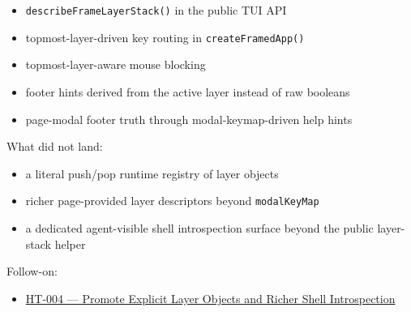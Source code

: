 \begin{itemize}
\tightlist
\item
  \texttt{d\allowbreak{}e\allowbreak{}s\allowbreak{}c\allowbreak{}r\allowbreak{}i\allowbreak{}b\allowbreak{}e\allowbreak{}F\allowbreak{}r\allowbreak{}a\allowbreak{}m\allowbreak{}e\allowbreak{}L\allowbreak{}a\allowbreak{}y\allowbreak{}e\allowbreak{}r\allowbreak{}S\allowbreak{}t\allowbreak{}a\allowbreak{}c\allowbreak{}k\allowbreak{}(\allowbreak{})} in the public TUI API
\item
  topmost-layer-driven key routing in \texttt{c\allowbreak{}r\allowbreak{}e\allowbreak{}a\allowbreak{}t\allowbreak{}e\allowbreak{}F\allowbreak{}r\allowbreak{}a\allowbreak{}m\allowbreak{}e\allowbreak{}d\allowbreak{}A\allowbreak{}p\allowbreak{}p\allowbreak{}(\allowbreak{})}
\item
  topmost-layer-aware mouse blocking
\item
  footer hints derived from the active layer instead of raw booleans
\item
  page-modal footer truth through modal-keymap-driven help hints
\end{itemize}

What did not land:

\begin{itemize}
\tightlist
\item
  a literal push/pop runtime registry of layer objects
\item
  richer page-provided layer descriptors beyond \texttt{m\allowbreak{}o\allowbreak{}d\allowbreak{}a\allowbreak{}l\allowbreak{}K\allowbreak{}e\allowbreak{}y\allowbreak{}M\allowbreak{}a\allowbreak{}p}
\item
  a dedicated agent-visible shell introspection surface beyond the public layer-stack helper
\end{itemize}

Follow-on:

\begin{itemize}
\tightlist
\item
  \href{https://github.com/flyingrobots/bijou/blob/cbd70612140e7a450d764b3c7be1c6af878b99bc/docs/method/graveyard/legacy-backlog/HT-004-promote-explicit-layer-objects-and-richer-shell-introspection.md}{HT-004 --- Promote Explicit Layer Objects and Richer Shell Introspection}
\end{itemize}

